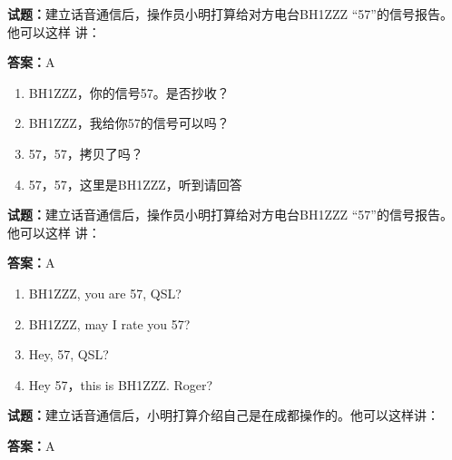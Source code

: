 \documentclass{ctexbook}
\begin{document}




\vspace{1em}

\textbf{试题：}建立话音通信后，操作员小明打算给对方电台BH1ZZZ “57”的信号报告。他可以这样
讲： 

\textbf{答案：}A 

\begin{enumerate}[leftmargin=3em]
  \item BH1ZZZ，你的信号57。是否抄收？ 

  \item BH1ZZZ，我给你57的信号可以吗？ 

  \item 57，57，拷贝了吗？ 

  \item 57，57，这里是BH1ZZZ，听到请回答 

\end{enumerate}






\vspace{1em}

\textbf{试题：}建立话音通信后，操作员小明打算给对方电台BH1ZZZ “57”的信号报告。他可以这样
讲： 

\textbf{答案：}A 

\begin{enumerate}[leftmargin=3em]
  \item BH1ZZZ, you are 57, QSL? 

  \item BH1ZZZ, may I rate you 57? 

  \item Hey, 57, QSL? 

  \item Hey 57，this is BH1ZZZ. Roger? 

\end{enumerate}





\vspace{1em}

\textbf{试题：}建立话音通信后，小明打算介绍自己是在成都操作的。他可以这样讲： 

\textbf{答案：}A 
\end{document}
